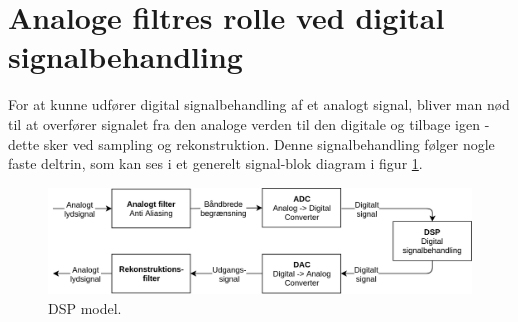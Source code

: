 
\section{Analoge filtres rolle ved digital signalbehandling}\label{sec:filter_intro}
For at kunne udfører digital signalbehandling af et analogt signal, bliver man nød til at overfører signalet fra den analoge verden til den digitale og tilbage igen - dette sker ved sampling og rekonstruktion.
Denne signalbehandling følger nogle faste deltrin, som kan ses i et generelt signal-blok diagram i figur \ref{fig:dsp_model}. 
\begin{figure}[h!]
	\centering
	\includegraphics[width=1\textwidth]{billeder/dsp_model.png}
	\caption{DSP model.}
	\label{fig:dsp_model}
\end{figure}


